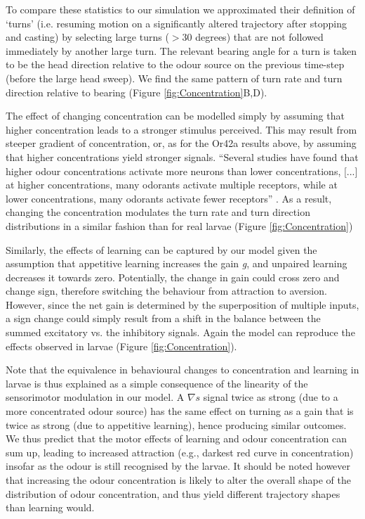\documentclass[11pt,a4paper]{article}
\begin{document}
 To compare these statistics to our simulation we approximated their definition of ‘turns’ (i.e. resuming motion on a significantly altered trajectory after stopping and casting) by selecting large turns ($>30$ degrees) that are not followed immediately by another large turn. The relevant bearing angle for a turn is taken to be the head direction relative to the odour source on the previous time-step (before the large head sweep). We find the same pattern of turn rate and turn direction relative to bearing (Figure \ref{fig:Concentration}B,D).

The effect of changing concentration can be modelled simply by assuming that higher concentration leads to a stronger stimulus perceived. This may result from steeper gradient of concentration, or, as for the Or42a results above, by assuming that higher concentrations yield stronger signals.  “Several studies have found that higher odour concentrations activate more neurons than lower concentrations, [...] at higher concentrations, many odorants activate multiple receptors, while at lower concentrations, many odorants activate fewer receptors” \citep{hallem2006coding}.
 As a result, changing the concentration modulates the turn rate and turn direction distributions in a similar fashion than for real larvae (Figure \ref{fig:Concentration})

Similarly, the effects of learning can be captured by our model given the assumption that appetitive learning increases the gain {\it g}, and unpaired learning decreases it towards zero. Potentially, the change in gain could cross zero and change sign, therefore switching the behaviour from attraction to aversion. However, since the net gain is determined by the superposition of multiple inputs, a sign change could simply result from a shift in the balance between the summed excitatory vs. the inhibitory signals. Again the model can reproduce the effects observed in larvae (Figure \ref{fig:Concentration}). 

Note that the equivalence in behavioural changes to concentration and learning in larvae is thus explained as a simple consequence of the linearity of the sensorimotor modulation in our model. A $\nabla s$ signal twice as strong (due to a more concentrated odour source) has the same effect on turning as a gain that is twice as strong (due to appetitive learning), hence producing similar outcomes. We thus predict that the motor effects of learning and odour concentration can sum up, leading to increased attraction (e.g., darkest red curve in concentration) insofar as the odour is still recognised by the larvae. It should be noted however that increasing the odour concentration is likely to alter the overall shape of the distribution of odour concentration, and thus yield different trajectory shapes than learning would.
\end{document}

